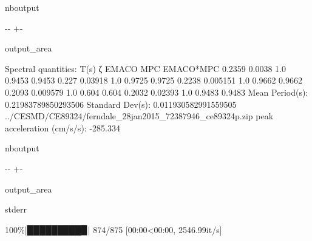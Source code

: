 \documentclass[letterpaper,10pt,english]{sphinxmanual}
\begin{document}
\begin{sphinxuseclass}{nboutput}
{

\kern-\sphinxverbatimsmallskipamount\kern-\baselineskip
\kern+\FrameHeightAdjust\kern-\fboxrule
\vspace{\nbsphinxcodecellspacing}

\begin{sphinxuseclass}{output_area}
\begin{sphinxuseclass}{}


\begin{sphinxVerbatim}[commandchars=\\\{\}]
Spectral quantities:
       T(s)        ζ        EMACO        MPC     EMACO*MPC
      0.2359     0.0038     1.0        0.9453     0.9453
      0.227      0.03918    1.0        0.9725     0.9725
      0.2238     0.005151   1.0        0.9662     0.9662
      0.2093     0.009579   1.0        0.604      0.604
      0.2032     0.02393    1.0        0.9483     0.9483
Mean Period(s): 0.21983789850293506
Standard Dev(s): 0.011930582991559505
../CESMD/CE89324/ferndale\_28jan2015\_72387946\_ce89324p.zip
peak acceleration (cm/s/s): -285.334
\end{sphinxVerbatim}



\end{sphinxuseclass}
\end{sphinxuseclass}
}

\end{sphinxuseclass}
\begin{sphinxuseclass}{nboutput}
{

\kern-\sphinxverbatimsmallskipamount\kern-\baselineskip
\kern+\FrameHeightAdjust\kern-\fboxrule
\vspace{\nbsphinxcodecellspacing}

\begin{sphinxuseclass}{output_area}
\begin{sphinxuseclass}{stderr}


\begin{sphinxVerbatim}[commandchars=\\\{\}]
100\%|█████████▉| 874/875 [00:00<00:00, 2546.99it/s]
\end{sphinxVerbatim}



\end{sphinxuseclass}
\end{sphinxuseclass}
}

\end{sphinxuseclass}
\end{document}

